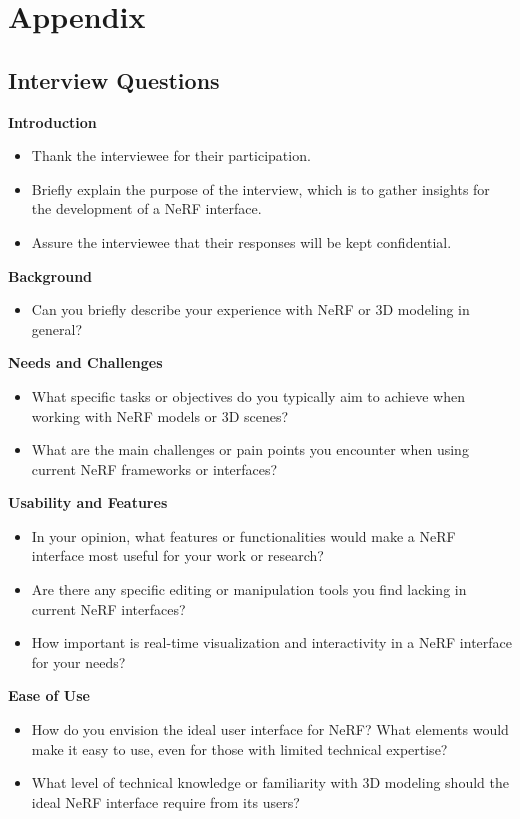 %
\chapter{Appendix}
\label{sec:appendix}


\section{Interview Questions}
\label{sec:appendix:interview-questions}

\textbf{Introduction}
\begin{itemize}
\item Thank the interviewee for their participation.
\item Briefly explain the purpose of the interview, which is to gather insights for the development of a NeRF interface.
\item Assure the interviewee that their responses will be kept confidential.
\end{itemize}

\textbf{Background}
\begin{itemize}
\item Can you briefly describe your experience with NeRF or 3D modeling in general?
\end{itemize}

\textbf{Needs and Challenges}
\begin{itemize}
\item What specific tasks or objectives do you typically aim to achieve when working with NeRF models or 3D scenes?
\item What are the main challenges or pain points you encounter when using current NeRF frameworks or interfaces?
\end{itemize}

\textbf{Usability and Features}
\begin{itemize}
\item In your opinion, what features or functionalities would make a NeRF interface most useful for your work or research?
\item Are there any specific editing or manipulation tools you find lacking in current NeRF interfaces?
\item How important is real-time visualization and interactivity in a NeRF interface for your needs?
\end{itemize}

\textbf{Ease of Use}
\begin{itemize}
\item How do you envision the ideal user interface for NeRF? What elements would make it easy to use, even for those with limited technical expertise?
\item What level of technical knowledge or familiarity with 3D modeling should the ideal NeRF interface require from its users?
\end{itemize}

